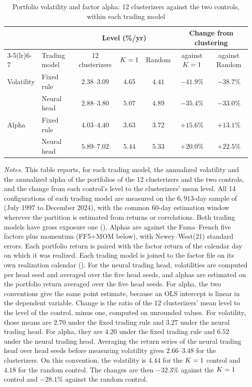 \begin{table}[tb]
\centering
\caption{Portfolio volatility and factor alpha: 12 clusterizers against the two
controls, within each trading model}
\label{tab:moments}
\begin{threeparttable}
\small
\setlength{\tabcolsep}{4pt}
\begin{tabular}{@{}llccccc@{}}
\toprule
& & \multicolumn{3}{c}{Level (\%/yr)} &
  \multicolumn{2}{c}{Change from clustering} \\
\cmidrule(lr){3-5}\cmidrule(lr){6-7}
& Trading model & 12 clusterizers & $K=1$ & Random & against $K=1$ & against Random \\
\midrule
Volatility & Fixed rule & $2.38$--$3.09$ & $4.65$ & $4.41$ & $-41.9\%$ & $-38.7\%$ \\
           & Neural head & $2.88$--$3.80$ & $5.07$ & $4.89$ & $-35.4\%$ & $-33.0\%$ \\
\addlinespace
Alpha      & Fixed rule & $4.03$--$4.40$ & $3.63$ & $3.72$ & $+15.6\%$ & $+13.1\%$ \\
           & Neural head & $5.89$--$7.02$ & $5.44$ & $5.33$ & $+20.0\%$ & $+22.5\%$ \\
\bottomrule
\end{tabular}
\begin{tablenotes}[flushleft]\small
\item \emph{Notes.} This table reports, for each trading model, the annualized volatility and the annualized alpha of the portfolios of the 12 clusterizers and the two controls, and the change from each control's level to the clusterizers' mean level. All 14 configurations of each trading model are measured on the $6{,}913$-day sample of  (July 1997 to December 2024), with the common 60-day estimation window wherever the partition is estimated from returns or correlations. Both trading models have gross exposure one (). Alphas are against the Fama--French five factors \citep{fama2015five} plus momentum \citep{carhart1997persistence} (FF5+MOM below), with Newey--West(21) standard errors. Each portfolio return is paired with the factor return of the calendar day on which it was realized. Each trading model is joined to the factor file on its own realization calendar (). For the neural trading head, volatilities are computed per head seed and averaged over the five head seeds, and alphas are estimated on the portfolio return averaged over the five head seeds. For alpha, the two conventions give the same point estimate, because an OLS intercept is linear in the dependent variable. Change is the ratio of the 12 clusterizers' mean level to the level of the control, minus one, computed on unrounded values. For volatility, those means are $2.70$ under the fixed trading rule and $3.27$ under the neural trading head. For alpha, they are $4.20$ under the fixed trading rule and $6.52$ under the neural trading head. Averaging the return series of the neural trading head over head seeds before measuring volatility gives $2.66$--$3.48$ for the clusterizers. On this convention, the volatility is $4.44$ for the $K=1$ control and $4.18$ for the random control. The changes are then $-32.3\%$ against the $K=1$ control and $-28.1\%$ against the random control.

\end{tablenotes}
\end{threeparttable}
\end{table}
